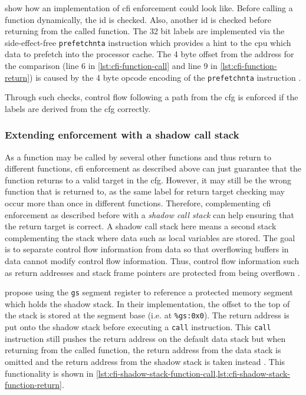  show how an implementation of \gls{cfi} enforcement could look like.
Before calling a function dynamically, the \gls{id} is checked.
Also, another \gls{id} is checked before returning from the called function.
The 32 bit labels are implemented via the side-effect-free \texttt{prefetchnta} instruction which provides a hint to the \gls{cpu} which data to prefetch into the processor cache.
The 4 byte offset from the address for the comparison (line 6 in \cref{lst:cfi-function-call} and line 9 in \cref{lst:cfi-function-return}) is caused by the 4 byte \gls{opcode} encoding of the \texttt{prefetchnta} instruction \cites[343\psqq]{Abadi2005}[4-406\psq]{IntelCorporation2020}.

Through such checks, control flow following a path from the \gls{cfg} is enforced if the labels are derived from the \gls{cfg} correctly.

\subsubsection{Extending  enforcement with a shadow call stack}
\label{subsubsec:cfi-shadow-stack}

As a function may be called by several other functions and thus return to different functions, \gls{cfi} enforcement as described above can just guarantee that the function returns to a valid target in the \gls{cfg}.
However, it may still be the wrong function that is returned to, as the same label for return target checking may occur more than once in different functions.
Therefore, complementing \gls{cfi} enforcement as described before with a \emph{shadow call stack} can help ensuring that the return target is correct.
A shadow call stack here means a second stack complementing the stack where data such as local variables are stored.
The goal is to separate control flow information from data so that overflowing buffers in data cannot modify control flow information.
Thus, control flow information such as return addresses and stack frame pointers are protected from being overflown \cite[348\psqq]{Abadi2005}.

 propose using the \texttt{gs} segment register to reference a protected memory segment which holds the shadow stack.
In their implementation, the offset to the top of the stack is stored at the segment base (i.e. at \texttt{\%gs:0x0}).
The return address is put onto the shadow stack before executing a \texttt{call} instruction.
This \texttt{call} instruction still pushes the return address on the default data stack but when returning from the called function, the return address from the data stack is omitted and the return address from the shadow stack is taken instead \cite[348\psq]{Abadi2005}.
This functionality is shown in \cref{lst:cfi-shadow-stack-function-call,lst:cfi-shadow-stack-function-return}.

